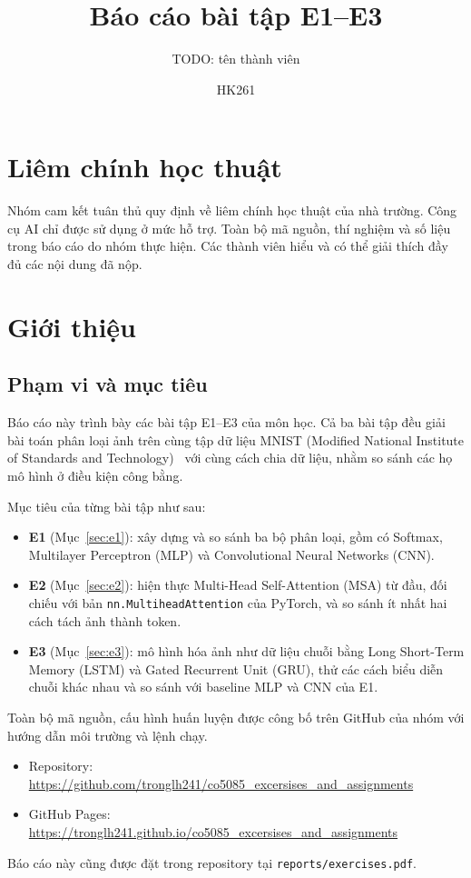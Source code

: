 \documentclass[a4paper,12pt]{article}
\title{Báo cáo bài tập E1--E3}
\author{TODO: tên thành viên}
\date{HK261}
\begin{document}
\maketitle
\newpage
\tableofcontents
\newpage

\section*{Liêm chính học thuật}
Nhóm cam kết tuân thủ quy định về liêm chính học thuật của nhà trường. Công cụ AI chỉ được sử dụng ở mức hỗ trợ. Toàn bộ mã nguồn, thí nghiệm và số liệu trong báo cáo do nhóm thực hiện. Các thành viên hiểu và có thể giải thích đầy đủ các nội dung đã nộp.

\section{Giới thiệu}
\label{sec:intro}

\subsection{Phạm vi và mục tiêu}
\label{sec:scope}

Báo cáo này trình bày các bài tập E1--E3 của môn học. Cả ba bài tập đều giải bài toán phân loại ảnh trên cùng tập dữ liệu MNIST (Modified National Institute of Standards and Technology)~\cite{lecun1998gradient} với cùng cách chia dữ liệu, nhằm so sánh các họ mô hình ở điều kiện công bằng.

Mục tiêu của từng bài tập như sau:

\begin{itemize}
    \item \textbf{E1} (Mục~\ref{sec:e1}): xây dựng và so sánh ba bộ phân loại, gồm có Softmax, Multilayer Perceptron (MLP) và Convolutional Neural Networks (CNN).
    \item \textbf{E2} (Mục~\ref{sec:e2}): hiện thực Multi-Head Self-Attention (MSA) từ đầu, đối chiếu với bản \texttt{nn.MultiheadAttention} của PyTorch, và so sánh ít nhất hai cách tách ảnh thành token.
    \item \textbf{E3} (Mục~\ref{sec:e3}): mô hình hóa ảnh như dữ liệu chuỗi bằng Long Short-Term Memory (LSTM) và Gated Recurrent Unit (GRU), thử các cách biểu diễn chuỗi khác nhau và so sánh với baseline MLP và CNN của E1.
\end{itemize}

Toàn bộ mã nguồn, cấu hình huấn luyện được công bố trên GitHub của nhóm với hướng dẫn môi trường và lệnh chạy.
\begin{itemize}
    \item Repository: \url{https://github.com/tronglh241/co5085_excersises_and_assignments}
    \item GitHub Pages: \url{https://tronglh241.github.io/co5085_excersises_and_assignments}
\end{itemize}
Báo cáo này cũng được đặt trong repository tại \texttt{reports/exercises.pdf}.
\end{document}

